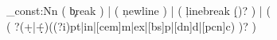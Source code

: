 \ifunicodeengine
\else
  \LetLtxMacro\HACKoldpdffilesize\pdffilesize
  \renewcommand\pdffilesize[1]{}
\fi
\usepackage{hyperxmp}
\ifunicodeengine
\else
  \LetLtxMacro\pdffilesize\HACKoldpdffilesize
\fi


\makeatletter
\ifpdf
  \ifxetex
    \relax
  \else
    \let\AtEndDvi@AtBeginShipout\relax
    \let\AtEndDvi@CheckImpl\relax
    \let\hyxmp@at@end\AtEndDocument
  \fi
\fi
\makeatother


\makeatletter
\ExplSyntaxOn

\regex_const:Nn \@IMEbreakRegex
  {
    ( \c{break} ) %
    |
    ( \c{newline} ) %
    |
    ( \c{linebreak} (\s*{}\s*\d\s*{})? )
    |
    ( \c{\\}
      ( \s*{}\s*
          [\+\-]?(\d+|\d*\.\d+)\s*((?i)pt|in|[cem]m|ex|[bs]p|[dn]d|[pcn]c)
        \s*{}
      )?
    )
  }

